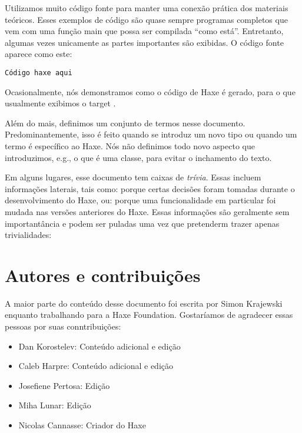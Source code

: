 Utilizamos muito código fonte para manter uma conexão prática dos materiais teóricos. Esses exemplos de código são quase sempre programas completos que vem com uma função main que possa ser compilada ``como está''. Entretanto, algumas vezes unicamente as partes importantes são exibidas. O código fonte aparece como este:

\begin{lstlisting}
Código haxe aqui
\end{lstlisting}

Ocasionalmente, nós demonstramos como o código de Haxe é gerado, para o que usualmente exibimos o target .

Além do mais, definimos um conjunto de termos nesse documento. Predominantemente, isso é feito quando se introduz um novo tipo ou quando um termo é específico ao Haxe. Nós não definimos todo novo aspecto que introduzimos, e.g., o que é uma classe, para evitar o inchamento do texto.


Em alguns lugares, esse documento tem caixas de \emph{trívia}. Essas incluem informações laterais, tais como: porque certas decisões foram tomadas durante o desenvolvimento do Haxe, ou: porque uma funcionalidade em particular foi mudada nas versões anteriores do Haxe. Essas informações são geralmente sem importantância e podem ser puladas uma vez que pretenderm trazer apenas trivialidades:


\section{Autores e contribuições}
\label{introduction-authors-and-contributions}

A maior parte do conteúdo desse documento foi escrita por Simon Krajewski enquanto trabalhando para a Haxe Foundation. Gostaríamos de agradecer essas pessoas por suas conntribuições:

\begin{itemize}
	\item Dan Korostelev: Conteúdo adicional e edição
	\item Caleb Harpre: Conteúdo adicional e edição
	\item Josefiene Pertosa: Edição
	\item Miha Lunar: Edição
	\item Nicolas Cannasse: Criador do Haxe
\end{itemize}

